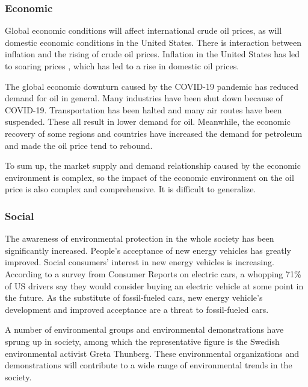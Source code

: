 \documentclass[
	a4paper, %
	12pt,%
]{CSSullivanBusinessReport}
\begin{document}
\begin{fullwidth}
\begin{enumerate}
\end{enumerate}

\par

\subsubsection{Economic}
Global economic conditions will affect international crude oil prices, as will domestic economic conditions in the United States. There is interaction between inflation and the rising of crude oil prices. Inflation in the United States has led to soaring prices , which has led to a rise in domestic oil prices.
\par
The global economic downturn caused by the COVID-19 pandemic has reduced demand for oil in general. Many industries have been shut down because of COVID-19. Transportation has been halted and many air routes have been suspended. These all result in lower demand for oil. Meanwhile, the economic recovery of some regions and countries have increased the demand for petroleum and made the oil price tend to rebound.
\par
To sum up, the market supply and demand relationship caused by the economic environment is complex, so the impact of the economic environment on the oil price is also complex and comprehensive. It is difficult to generalize.
\subsubsection{Social}
The awareness of environmental protection in the whole society has been significantly increased. People's acceptance of new energy vehicles has greatly improved. Social consumers’ interest in new energy vehicles is increasing. According to a survey from Consumer Reports on electric cars, a whopping 71\% of US drivers say they would consider buying an electric vehicle at some point in the future. As the substitute of fossil-fueled cars, new energy vehicle’s development and improved acceptance are a threat to fossil-fueled cars.
\par
A number of environmental groups and environmental demonstrations have sprung up in society, among which the representative figure is the Swedish environmental activist Greta Thunberg. These environmental organizations and demonstrations will contribute to a wide range of environmental trends in the society.

\end{fullwidth}
\end{document}
